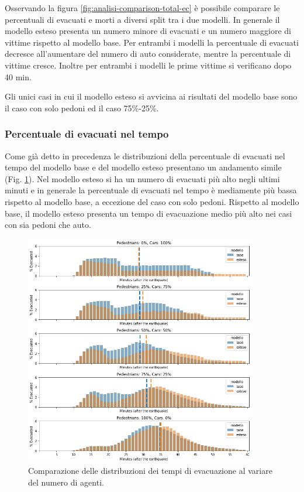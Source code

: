 Osservando la figura \ref{fig:analisi-comparison-total-ec} è possibile comparare le percentuali di evacuati e morti a diversi split tra i due modelli.
In generale il modello esteso presenta un numero minore di evacuati e un numero maggiore di vittime rispetto al modello base.
Per entrambi i modelli la percentuale di evacuati decresce all'aumentare del numero di auto considerate, mentre la percentuale di vittime cresce.
Inoltre per entrambi i modelli le prime vittime si verificano dopo 40 min.

Gli unici casi in cui il modello esteso si avvicina ai risultati del modello base sono il caso con solo pedoni ed il caso 75\%-25\%.

\pagebreak

\subsubsection*{Percentuale di evacuati nel tempo}

Come già detto in precedenza le distribuzioni della percentuale di evacuati nel tempo del modello base e del modello esteso 
presentano un andamento simile (Fig. \ref{fig:analisi-comparison-evtimes}).
%
Nel modello esteso si ha un numero di evacuati più alto negli ultimi minuti e 
in generale la percentuale di evacuati nel tempo è mediamente più bassa rispetto al modello base, a eccezione del caso con solo pedoni.
%
Rispetto al modello base, il modello esteso presenta un tempo di evacuazione medio più alto nei casi con sia pedoni che auto.

\begin{figure}[ht]
    \centering
    \includegraphics[width=0.9\textwidth]{images/analisi/comparison-evtimes.png}
    \caption{Comparazione delle distribuzioni dei tempi di evacuazione al variare del numero di agenti.}
    \label{fig:analisi-comparison-evtimes}
\end{figure}

